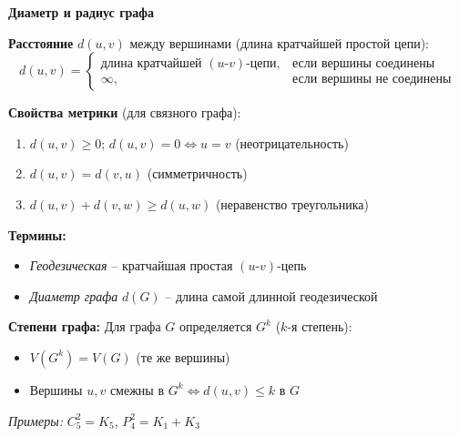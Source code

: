 \textbf{Диаметр и радиус графа}

\noindent\textbf{Расстояние} $d(u,v)$ между вершинами (длина кратчайшей простой цепи):
\[
d(u,v) = \begin{cases} 
\text{длина кратчайшей }(u\text{-}v)\text{-цепи}, & \text{если вершины соединены} \\
\infty, & \text{если вершины не соединены}
\end{cases}
\]

\noindent\textbf{Свойства метрики} (для связного графа):
\begin{enumerate}
    \item $d(u,v) \geq 0$; $d(u,v) = 0 \Leftrightarrow u = v$ (неотрицательность)
    \item $d(u,v) = d(v,u)$ (симметричность)
    \item $d(u,v) + d(v,w) \geq d(u,w)$ (неравенство треугольника)
\end{enumerate}

\noindent\textbf{Термины:}
\begin{itemize}
    \item \textit{Геодезическая} -- кратчайшая простая $(u\text{-}v)$-цепь
    \item \textit{Диаметр графа} $d(G)$ -- длина самой длинной геодезической
\end{itemize}

\noindent\textbf{Степени графа:} 
Для графа $G$ определяется $G^k$ ($k$-я степень):
\begin{itemize}
    \item $V(G^k) = V(G)$ (те же вершины)
    \item Вершины $u,v$ смежны в $G^k \Leftrightarrow d(u,v) \leq k$ в $G$
\end{itemize}

\noindent\textit{Примеры:} $C_5^2 = K_5$, $P_4^2 = K_1 + K_3$
